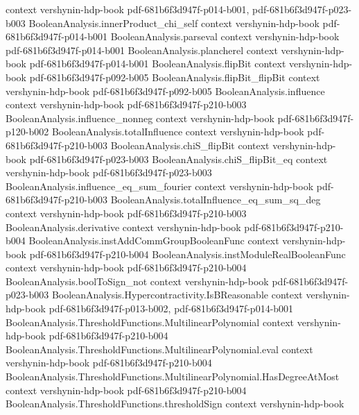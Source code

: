 \begin{theorem}
  {context}
  {vershynin-hdp-book}
  {pdf-681b6f3d947f-p014-b001,
    pdf-681b6f3d947f-p023-b003}
\proofstep
  {BooleanAnalysis.innerProduct_chi_self}
  {context}
  {vershynin-hdp-book}
  {pdf-681b6f3d947f-p014-b001}
\proofstep
  {BooleanAnalysis.parseval}
  {context}
  {vershynin-hdp-book}
  {pdf-681b6f3d947f-p014-b001}
\proofstep
  {BooleanAnalysis.plancherel}
  {context}
  {vershynin-hdp-book}
  {pdf-681b6f3d947f-p014-b001}
\proofstep
  {BooleanAnalysis.flipBit}
  {context}
  {vershynin-hdp-book}
  {pdf-681b6f3d947f-p092-b005}
\proofstep
  {BooleanAnalysis.flipBit_flipBit}
  {context}
  {vershynin-hdp-book}
  {pdf-681b6f3d947f-p092-b005}
\proofstep
  {BooleanAnalysis.influence}
  {context}
  {vershynin-hdp-book}
  {pdf-681b6f3d947f-p210-b003}
\proofstep
  {BooleanAnalysis.influence_nonneg}
  {context}
  {vershynin-hdp-book}
  {pdf-681b6f3d947f-p120-b002}
\proofstep
  {BooleanAnalysis.totalInfluence}
  {context}
  {vershynin-hdp-book}
  {pdf-681b6f3d947f-p210-b003}
\proofstep
  {BooleanAnalysis.chiS_flipBit}
  {context}
  {vershynin-hdp-book}
  {pdf-681b6f3d947f-p023-b003}
\proofstep
  {BooleanAnalysis.chiS_flipBit_eq}
  {context}
  {vershynin-hdp-book}
  {pdf-681b6f3d947f-p023-b003}
\proofstep
  {BooleanAnalysis.influence_eq_sum_fourier}
  {context}
  {vershynin-hdp-book}
  {pdf-681b6f3d947f-p210-b003}
\proofstep
  {BooleanAnalysis.totalInfluence_eq_sum_sq_deg}
  {context}
  {vershynin-hdp-book}
  {pdf-681b6f3d947f-p210-b003}
\proofstep
  {BooleanAnalysis.derivative}
  {context}
  {vershynin-hdp-book}
  {pdf-681b6f3d947f-p210-b004}
\proofstep
  {BooleanAnalysis.instAddCommGroupBooleanFunc}
  {context}
  {vershynin-hdp-book}
  {pdf-681b6f3d947f-p210-b004}
\proofstep
  {BooleanAnalysis.instModuleRealBooleanFunc}
  {context}
  {vershynin-hdp-book}
  {pdf-681b6f3d947f-p210-b004}
\proofstep
  {BooleanAnalysis.boolToSign_not}
  {context}
  {vershynin-hdp-book}
  {pdf-681b6f3d947f-p023-b003}
\proofstep
  {BooleanAnalysis.Hypercontractivity.IsBReasonable}
  {context}
  {vershynin-hdp-book}
  {pdf-681b6f3d947f-p013-b002,
    pdf-681b6f3d947f-p014-b001}
\proofstep
  {BooleanAnalysis.ThresholdFunctions.MultilinearPolynomial}
  {context}
  {vershynin-hdp-book}
  {pdf-681b6f3d947f-p210-b004}
\proofstep
  {BooleanAnalysis.ThresholdFunctions.MultilinearPolynomial.eval}
  {context}
  {vershynin-hdp-book}
  {pdf-681b6f3d947f-p210-b004}
\proofstep
  {BooleanAnalysis.ThresholdFunctions.MultilinearPolynomial.HasDegreeAtMost}
  {context}
  {vershynin-hdp-book}
  {pdf-681b6f3d947f-p210-b004}
\proofstep
  {BooleanAnalysis.ThresholdFunctions.thresholdSign}
  {context}
  {vershynin-hdp-book}

\end{theorem}
